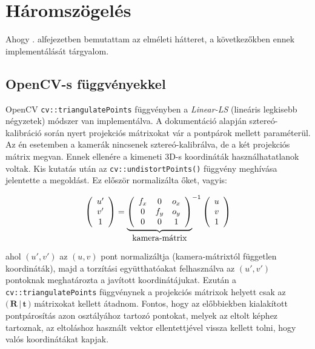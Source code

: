 \section{Háromszögelés}

Ahogy . alfejezetben bemutattam az elméleti hátteret, a következőkben ennek implementálását tárgyalom.

\subsection{OpenCV-s függvényekkel}

OpenCV \texttt{cv::triangulatePoints} függvényben a \textit{Linear-LS} (lineáris legkisebb négyzetek) módszer van implementálva. A dokumentáció \cite{camera-calib-3d} alapján sztereó-kalibráció során nyert projekciós mátrixokat vár a pontpárok mellett paraméterül. Az én esetemben a kamerák nincsenek sztereó-kalibrálva, de a két projekciós mátrix megvan. Ennek ellenére a kimeneti 3D-s koordináták használhatatlanok voltak. Kis kutatás után az \texttt{cv::undistortPoints()} függvény meghívása jelentette a megoldást. Ez először normalizálta őket, vagyis:

\[\left(\begin{array}{c} u' \\ v' \\ 1 \end{array}\right) = {\underbrace{\left(\begin{array}{ccc}
f_x & 0 & o_x \\ 
0 & f_y & o_y \\
0 & 0 & 1
\end{array}\right)}_{\hbox{kamera-mátrix}}}^{-1} \left(\begin{array}{c} u \\ v \\ 1 \end{array}\right)\]

ahol $(u', v')$ az $(u, v)$ pont normalizáltja (kamera-mátrixtól független koordináták), majd a torzítási együtthatóakat felhasználva az $(u', v')$ pontoknak meghatározta a javított koordinátájukat. Ezután a \texttt{cv::triangulatePoints} függvénynek a projekciós mátrixok helyett csak az $\Big(\,\mathbf{R}\,|\,\mathbf{t}\,\Big)$ mátrixokat kellett átadnom. Fontos, hogy az előbbiekben kialakított pontpárosítás azon osztályához tartozó pontokat, melyek az eltolt képhez tartoznak, az eltoláshoz használt vektor ellentettjével vissza kellett tolni, hogy valós koordinátákat kapjak.

